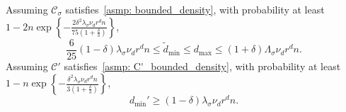 \documentclass[11pt,twoside]{article}
\newcommand{\set}[1]{\left\{#1\right\}}
\newcommand{\1}{\mathbbm{1}}
\newcommand{\Cset}{\mathcal{C}}
\newcommand{\Csig}{\Cset_{\sigma}}
\newcommand{\degminpr}{d_{\min}'}
\newcommand{\degminwt}{\widetilde{d}_{\min}}
\begin{document}
\begin{lemma}
	\noindent Assuming $\Csig$ satisfies~\ref{asmp: bounded_density}, with probability at least $1 - 2n\exp\set{-\frac{2 \delta^2 \lambda_{\sigma} \nu_d r^d n}{75(1 + \frac{\delta}{3})}}$,
	\begin{equation}
	\label{eqn:degwt_bound}
	\frac{6}{25}(1 - \delta)\lambda_{\sigma}\nu_dr^dn \leq \degminwt \leq d_{\max} \leq (1 + \delta) \Lambda_{\sigma} \nu_dr^dn.
	\end{equation}
	Assuming $\Cset'$ satisfies~\ref{asmp: C'_bounded_density}, with probability at least $1 - n\exp\set{-\frac{\delta^2 \lambda_{\sigma} \nu_d r^d n}{3(1 + \frac{\delta}{3})}}$,
	\begin{equation}
	\label{eqn:degpr_bound}
	\degminpr \geq (1 - \delta)\lambda_{\sigma}\nu_dr^dn.
	\end{equation}
\end{lemma}
\end{document}
